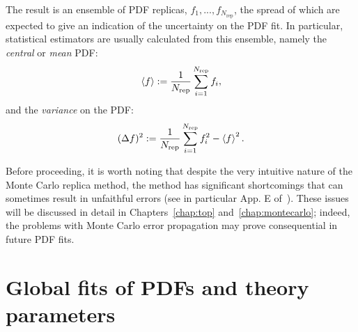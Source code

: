 \documentclass[withindex,glossary]{cam-thesis}
\begin{document}
The result is an ensemble of PDF replicas, $f_1,..., f_{N_{\text{rep}}}$, the spread of which are expected to give an indication of the uncertainty on the PDF fit. In particular, statistical estimators are usually calculated from this ensemble, namely the \textit{central} or \textit{mean} PDF:
\begin{equation}
\braket{f} := \frac{1}{N_{\text{rep}}}\sum_{i=1}^{N_{\text{rep}}} f_i,
\end{equation}
and the \textit{variance} on the PDF:
\begin{equation}
(\Delta f)^2 := \frac{1}{N_{\text{rep}}} \sum_{i=1}^{N_{\text{rep}}} f_i^2 - \braket{f}^2.
\end{equation}

Before proceeding, it is worth noting that despite the very intuitive nature of the Monte Carlo replica method, the method has significant shortcomings that can sometimes result in unfaithful errors (see in particular App. E of~\cite{Kassabov:2023hbm}). These issues will be discussed in detail in Chapters~\ref{chap:top} and~\ref{chap:montecarlo}; indeed, the problems with Monte Carlo error propagation may prove consequential in future PDF fits.



\section{Global fits of PDFs and theory parameters}
\label{sec:globalfits}
\end{document}
